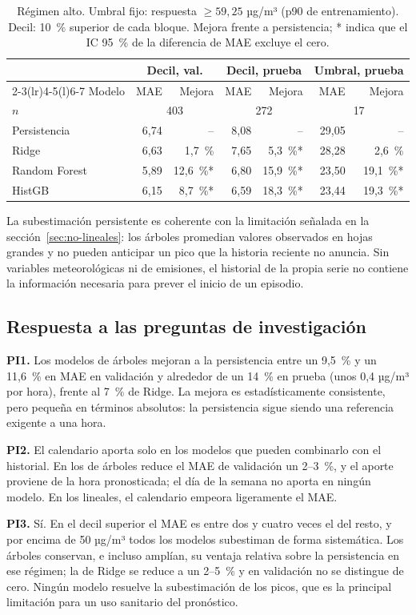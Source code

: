 \begin{table}[t]
\centering
\caption{Régimen alto. Umbral fijo: respuesta $\geq 59{,}25$ µg/m³ (p90 de entrenamiento). Decil: 10~\% superior de cada bloque. Mejora frente a persistencia; * indica que el IC 95~\% de la diferencia de MAE excluye el cero.}
\label{tab:regimen}
\small
\setlength{\tabcolsep}{3pt}
\begin{tabular}{@{}lrrrrrr@{}}
\toprule
& \multicolumn{2}{c}{Decil, val.} & \multicolumn{2}{c}{Decil, prueba} & \multicolumn{2}{c}{Umbral, prueba} \\
\cmidrule(lr){2-3}\cmidrule(lr){4-5}\cmidrule(l){6-7}
Modelo & MAE & Mejora & MAE & Mejora & MAE & Mejora \\
\midrule
$n$ & \multicolumn{2}{c}{403} & \multicolumn{2}{c}{272} & \multicolumn{2}{c}{17} \\
Persistencia & 6,74 & -- & 8,08 & -- & 29,05 & -- \\
Ridge & 6,63 & 1,7~\% & 7,65 & 5,3~\%* & 28,28 & 2,6~\% \\
Random Forest & 5,89 & 12,6~\%* & 6,80 & 15,9~\%* & 23,50 & 19,1~\%* \\
HistGB & 6,15 & 8,7~\%* & 6,59 & 18,3~\%* & 23,44 & 19,3~\%* \\
\bottomrule
\end{tabular}
\end{table}

La subestimación persistente es coherente con la limitación señalada en la sección~\ref{sec:no-lineales}: los árboles promedian valores observados en hojas grandes y no pueden anticipar un pico que la historia reciente no anuncia. Sin variables meteorológicas ni de emisiones, el historial de la propia serie no contiene la información necesaria para prever el inicio de un episodio.

\subsection{Respuesta a las preguntas de investigación}
\label{sec:respuestas}
\textbf{PI1.} Los modelos de árboles mejoran a la persistencia entre un 9,5~\% y un 11,6~\% en MAE en validación y alrededor de un 14~\% en prueba (unos 0,4 µg/m³ por hora), frente al 7~\% de Ridge. La mejora es estadísticamente consistente, pero pequeña en términos absolutos: la persistencia sigue siendo una referencia exigente a una hora.

\textbf{PI2.} El calendario aporta solo en los modelos que pueden combinarlo con el historial. En los de árboles reduce el MAE de validación un 2--3~\%, y el aporte proviene de la hora pronosticada; el día de la semana no aporta en ningún modelo. En los lineales, el calendario empeora ligeramente el MAE.

\textbf{PI3.} Sí. En el decil superior el MAE es entre dos y cuatro veces el del resto, y por encima de 50 µg/m³ todos los modelos subestiman de forma sistemática. Los árboles conservan, e incluso amplían, su ventaja relativa sobre la persistencia en ese régimen; la de Ridge se reduce a un 2--5~\% y en validación no se distingue de cero. Ningún modelo resuelve la subestimación de los picos, que es la principal limitación para un uso sanitario del pronóstico.
